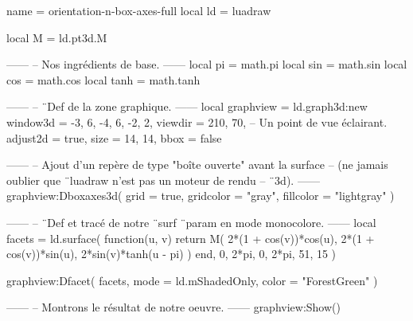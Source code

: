 \documentclass[border = 3pt]{standalone}
\begin{document}
\begin{luadraw*}{name = orientation-n-box-axes-full}
local ld = luadraw

local M = ld.pt3d.M

------
-- Nos ingrédients de base.
------
local pi   = math.pi
local sin  = math.sin
local cos  = math.cos
local tanh = math.tanh

------
-- ¨Def de la zone graphique.
------
local graphview = ld.graph3d:new{
  window3d = {-3, 6, -4, 6, -2, 2},
  viewdir  = {210, 70},  -- Un point de vue éclairant.
  adjust2d = true,
  size     = {14, 14},
  bbox     = false
}

------
-- Ajout d'un repère de type "boîte ouverte" avant la surface
-- (ne jamais oublier que ¨luadraw n'est pas un moteur de rendu
-- ¨3d).
------
graphview:Dboxaxes3d({
  grid      = true,
  gridcolor = "gray",
  fillcolor = "lightgray"
})

------
-- ¨Def et tracé de notre ¨surf ¨param en mode monocolore.
------
local facets = ld.surface(
  function(u, v)
    return M(
      2*(1 + cos(v))*cos(u),
      2*(1 + cos(v))*sin(u),
      2*sin(v)*tanh(u - pi)
    )
  end,
  0, 2*pi, 0, 2*pi,
  {51, 15}
)

graphview:Dfacet(
  facets,
  {
    mode  = ld.mShadedOnly,
    color = "ForestGreen"
  }
)

------
-- Montrons le résultat de notre oeuvre.
------
graphview:Show()
\end{luadraw*}
\end{document}

